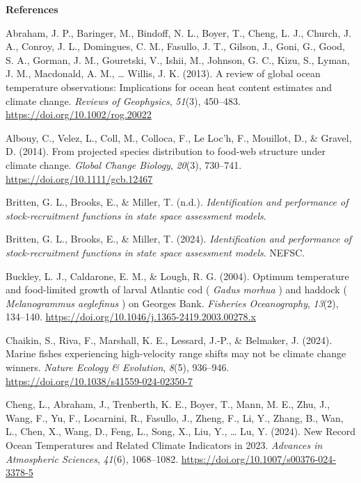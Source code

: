 \documentclass[
  12pt,
]{article}
\newlength{\cslhangindent}
\newenvironment{CSLReferences}[2] %
 {\begin{list}{}{%
  \setlength{\itemindent}{0pt}
  \setlength{\leftmargin}{0pt}
  \setlength{\parsep}{0pt}
  \ifodd #1
   \setlength{\leftmargin}{\cslhangindent}
   \setlength{\itemindent}{-1\cslhangindent}
  \fi
  \setlength{\itemsep}{#2\baselineskip}}}
 {\end{list}}
\begin{document}
\newpage

\textbf{References}

\label{refs}
\begin{CSLReferences}{1}{2}
Abraham, J. P., Baringer, M., Bindoff, N. L., Boyer, T., Cheng, L. J., Church, J. A., Conroy, J. L., Domingues, C. M., Fasullo, J. T., Gilson, J., Goni, G., Good, S. A., Gorman, J. M., Gouretski, V., Ishii, M., Johnson, G. C., Kizu, S., Lyman, J. M., Macdonald, A. M., \ldots{} Willis, J. K. (2013). A review of global ocean temperature observations: Implications for ocean heat content estimates and climate change. \emph{Reviews of Geophysics}, \emph{51}(3), 450--483. \url{https://doi.org/10.1002/rog.20022}

Albouy, C., Velez, L., Coll, M., Colloca, F., Le Loc'h, F., Mouillot, D., \& Gravel, D. (2014). From projected species distribution to food{-}web structure under climate change. \emph{Global Change Biology}, \emph{20}(3), 730--741. \url{https://doi.org/10.1111/gcb.12467}

Britten, G. L., Brooks, E., \& Miller, T. (n.d.). \emph{Identification and performance of stock-recruitment functions in state space assessment models}.

Britten, G. L., Brooks, E., \& Miller, T. (2024). \emph{Identification and performance of stock-recruitment functions in state space assessment models}. NEFSC.

Buckley, L. J., Caldarone, E. M., \& Lough, R. G. (2004). Optimum temperature and food{-}limited growth of larval Atlantic cod ( {\emph{Gadus morhua}} ) and haddock ( {\emph{Melanogrammus aeglefinus}} ) on Georges Bank. \emph{Fisheries Oceanography}, \emph{13}(2), 134--140. \url{https://doi.org/10.1046/j.1365-2419.2003.00278.x}

Chaikin, S., Riva, F., Marshall, K. E., Lessard, J.-P., \& Belmaker, J. (2024). Marine fishes experiencing high-velocity range shifts may not be climate change winners. \emph{Nature Ecology \& Evolution}, \emph{8}(5), 936--946. \url{https://doi.org/10.1038/s41559-024-02350-7}

Cheng, L., Abraham, J., Trenberth, K. E., Boyer, T., Mann, M. E., Zhu, J., Wang, F., Yu, F., Locarnini, R., Fasullo, J., Zheng, F., Li, Y., Zhang, B., Wan, L., Chen, X., Wang, D., Feng, L., Song, X., Liu, Y., \ldots{} Lu, Y. (2024). New Record Ocean Temperatures and Related Climate Indicators in 2023. \emph{Advances in Atmospheric Sciences}, \emph{41}(6), 1068--1082. \url{https://doi.org/10.1007/s00376-024-3378-5}


\end{CSLReferences}
\end{document}
